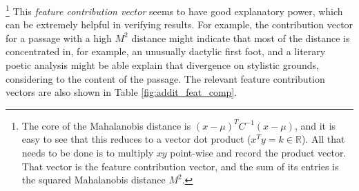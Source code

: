 \documentclass[11pt,a4paper]{scrartcl} %
\begin{document}
{\footnote{The core of the Mahalanobis distance is $(x-\mu)^{T}C^{-1}(x-\mu)$, and it is easy to see that this reduces to a vector dot product ($x^{T}y=k \in \mathbb{R}$). All that needs to be done is to multiply $xy$ point-wise and record the product vector. That vector is the feature contribution vector, and the sum of its entries is the squared Mahalanobis distance $M^{2}$.}
This \textit{feature contribution vector} seems to have good explanatory power, which can be extremely helpful in verifying results. For example, the contribution vector for a passage with a high $M^{2}$ distance might indicate that most of the distance is concentrated in, for example, an unusually dactylic first foot, and a literary poetic analysis might be able explain that divergence on stylistic grounds, considering to the content of the passage. The relevant feature contribution vectors are also shown in Table \ref{fig:addit_feat_comp}.

\begin{table}
\caption{Feature contribution vectors and Mahalanobis distance ($M^{2}$) when comparing the Additamentum to Silius' \textit{Punica} and Vergil's \textit{Aeneid}. For comparison, distance from the centroid of the \textit{Aeneid} to the \textit{Punica}.}
\label{fig:addit_feat_comp}
\phantom{x}
\centering
{}
\end{table}

}
\end{document}
